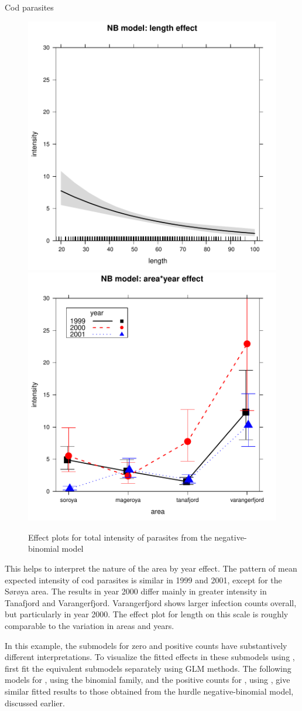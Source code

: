 \documentclass[11pt]{book}\usepackage[]{graphicx}\usepackage[]{color}
\newenvironment{knitrout}{}{} %
\renewenvironment{knitrout}{\small\renewcommand{\baselinestretch}{.85}}{} %
\begin{document}
\begin{Example}[cod3]{Cod parasites}
\begin{knitrout}
\begin{figure}[!htbp]
\centerline{\includegraphics[width=.49\textwidth]{ch09/fig/cod3-eff11} 
\includegraphics[width=.49\textwidth]{ch09/fig/cod3-eff12} }

\caption[Effect plots for total intensity of parasites from the negative-binomial model]{Effect plots for total intensity of parasites from the negative-binomial model\label{fig:cod3-eff1}}
\end{figure}


\end{knitrout}
This helps to interpret the nature of the area by year effect.  The pattern of mean expected
intensity of cod parasites is similar in 1999 and 2001, except for the S{\o}r{\o}ya area.
The results in year 2000 differ mainly in greater intensity in Tanafjord and Varangerfjord.
Varangerfjord shows larger infection counts overall, but particularly in year 2000.
The effect plot for length on this scale is roughly comparable to the variation in 
areas and years.

In this example, the submodels for zero and positive counts have substantively different
interpretations. To visualize the fitted effects in these submodels using ,
first fit the equivalent submodels separately using GLM methods. The following
models for , using the binomial family,
and the positive counts for , using ,
give similar fitted
results to those obtained from the hurdle negative-binomial model, 
discussed earlier.  


\end{Example}
\end{document}
